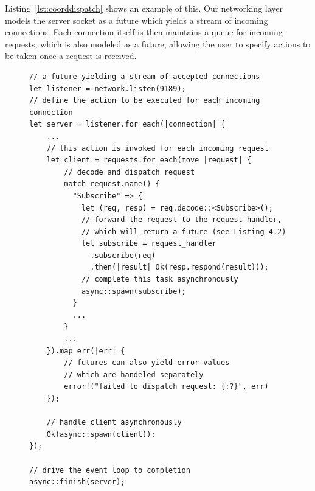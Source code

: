 Listing~\ref{lst:coorddispatch} shows an example of this. Our networking layer
models the server socket as a future which yields a stream of incoming connections.
Each connection itself is then maintains a queue for incoming requests, which is
also modeled as a future, allowing the user to specify actions to be taken
once a request is received.

\begin{figure}[htb]
\begin{lstlisting}[caption={[Connection handling at the coordinator]%
Accepting and dispatching incoming connections. The actions specified
in \lstinline{for_each} and \lstinline{map_err} are invoked by the
task dispatcher when the corresponding events (such as new incoming connections,
new incoming requests or errors during request handling) occur.},label={lst:coorddispatch}]
// a future yielding a stream of accepted connections
let listener = network.listen(9189);
// define the action to be executed for each incoming connection
let server = listener.for_each(|connection| {
    ...   
    // this action is invoked for each incoming request
    let client = requests.for_each(move |request| {
        // decode and dispatch request 
        match request.name() {
          "Subscribe" => {
            let (req, resp) = req.decode::<Subscribe>();
            // forward the request to the request handler,
            // which will return a future (see Listing 4.2)
            let subscribe = request_handler
              .subscribe(req)
              .then(|result| Ok(resp.respond(result)));
            // complete this task asynchronously
            async::spawn(subscribe);
          }
          ...
        }
        ...
    }).map_err(|err| {
        // futures can also yield error values
        // which are handeled separately
        error!("failed to dispatch request: {:?}", err)
    });

    // handle client asynchronously
    Ok(async::spawn(client));
});

// drive the event loop to completion
async::finish(server);
\end{lstlisting}
\end{figure}

